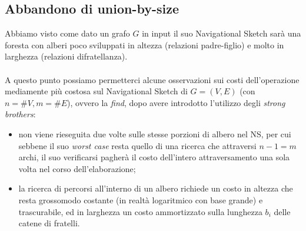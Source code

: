 \documentclass[a4paper,11pt]{report}
\begin{document}
\subsection{Abbandono di union-by-size}
Abbiamo visto come dato un grafo $G$ in input il suo Navigational Sketch sarà una foresta con alberi poco sviluppati in altezza (relazioni
padre-figlio) e molto in 
larghezza (relazioni difratellanza).
\paragraph{}
A questo punto possiamo permetterci alcune osservazioni sui costi dell'operazione mediamente più costosa sul Navigational Sketch di
$G=(V,E)$ (con $n=\#V, m=\#E$), 
ovvero la \emph{find}, 
dopo avere introdotto l'utilizzo degli \emph{strong brothers}:
\begin{itemize}
 \item non viene rieseguita due volte sulle stesse porzioni di albero nel NS, per cui sebbene il suo \emph{worst case}
resta quello di una ricerca che attraversi $n-1=m$ archi, il suo verificarsi pagherà il costo dell'intero attraversamento una sola volta nel
corso dell'elaborazione;
 \item la ricerca di percorsi all'interno di un albero richiede un costo in altezza che resta grossomodo costante (in realtà logaritmico con
base grande) e trascurabile,
 ed in larghezza un costo ammortizzato sulla lunghezza $b_i$ delle catene di fratelli.
\end{itemize}
\end{document}
